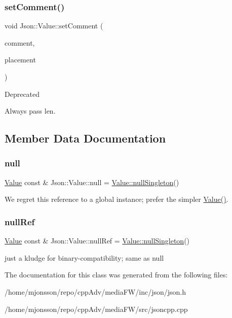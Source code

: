 \subsubsection{\texorpdfstring{set\+Comment()}{setComment()}}
{\footnotesize\ttfamily void Json\+::\+Value\+::set\+Comment (\begin{DoxyParamCaption}\item[{const char $\ast$}]{comment,  }\item[{\hyperlink{namespaceJson_a4fc417c23905b2ae9e2c47d197a45351}{Comment\+Placement}}]{placement }\end{DoxyParamCaption})}

\begin{DoxyRefDesc}{Deprecated}
\item[\hyperlink{deprecated__deprecated000003}{Deprecated}]Always pass len. \end{DoxyRefDesc}


\subsection{Member Data Documentation}
\mbox{\label{classJson_1_1Value_a21ddb05b92c60c7548e928bf371e7d45}} 
\subsubsection{\texorpdfstring{null}{null}}
{\footnotesize\ttfamily \hyperlink{classJson_1_1Value}{Value} const  \& Json\+::\+Value\+::null = \hyperlink{classJson_1_1Value_af2f124567acc35d021a424e53ebdfcab}{Value\+::null\+Singleton}()\hspace{0.3cm}{\ttfamily [static]}}

We regret this reference to a global instance; prefer the simpler \hyperlink{classJson_1_1Value_ada6ba1369448fb0240bccc36efaa46f7}{Value()}. \mbox{\label{classJson_1_1Value_aaee27e622f87266f861216d644603730}} 
\subsubsection{\texorpdfstring{null\+Ref}{nullRef}}
{\footnotesize\ttfamily \hyperlink{classJson_1_1Value}{Value} const  \& Json\+::\+Value\+::null\+Ref = \hyperlink{classJson_1_1Value_af2f124567acc35d021a424e53ebdfcab}{Value\+::null\+Singleton}()\hspace{0.3cm}{\ttfamily [static]}}

just a kludge for binary-\/compatibility; same as null 

The documentation for this class was generated from the following files\+:\begin{DoxyCompactItemize}
\item 
/home/mjonsson/repo/cpp\+Adv/media\+F\+W/inc/json/json.\+h\item 
/home/mjonsson/repo/cpp\+Adv/media\+F\+W/src/jsoncpp.\+cpp\end{DoxyCompactItemize}
